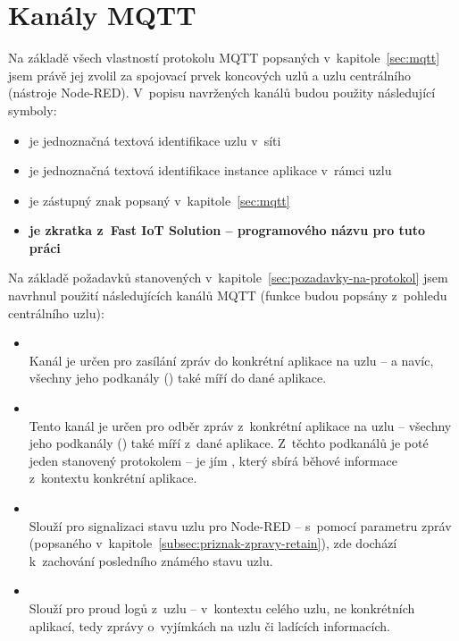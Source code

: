 \section{Kanály MQTT}\label{sec:mqtt-kanaly}
Na základě všech vlastností protokolu MQTT popsaných v~kapitole~\ref{sec:mqtt} jsem právě jej zvolil za spojovací
prvek koncových uzlů a uzlu centrálního (nástroje Node-RED).
V~popisu navržených kanálů budou použity následující symboly:
\begin{itemize}
    \item {} je jednoznačná textová identifikace uzlu v~síti
    \item {} je jednoznačná textová identifikace instance aplikace v~rámci uzlu
    \item \ic{\#} je zástupný znak popsaný v~kapitole~\ref{sec:mqtt}
    \item {} \textbf{je zkratka z~Fast IoT Solution -- programového názvu pro tuto práci}
\end{itemize}

Na základě požadavků stanovených v~kapitole~\ref{sec:pozadavky-na-protokol} jsem navrhnul použití následujících
kanálů MQTT (funkce budou popsány z~pohledu centrálního uzlu):

\begin{itemize}
    \item {} \\
    Kanál je určen pro zasílání zpráv do konkrétní aplikace na uzlu -- a navíc,
    všechny jeho podkanály () také míří do dané aplikace.

    \item {} \\
    Tento kanál je určen pro odběr zpráv z~konkrétní aplikace na uzlu --
    všechny jeho podkanály () také míří z~dané aplikace.
    Z~těchto podkanálů je poté jeden stanovený protokolem -- je jím , který sbírá běhové informace z~kontextu
    konkrétní aplikace.

    \item {} \\
    Slouží pro signalizaci stavu uzlu pro Node-RED -- s~pomocí parametru zpráv  (popsaného
    v~kapitole~\ref{subsec:priznak-zpravy-retain}), zde dochází k~zachování posledního známého stavu uzlu.

    \item {} \\
    Slouží pro proud logů z~uzlu -- v~kontextu celého uzlu, ne konkrétních aplikací, tedy zprávy o~vyjímkách na uzlu
    či ladících informacích.
\end{itemize}

